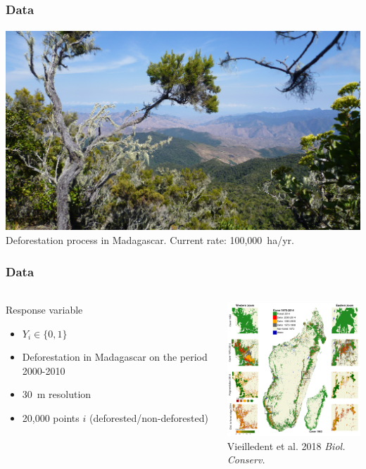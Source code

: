 \documentclass[slidetop,10pt,dvipsnames,leqno,fleqn]{beamer} %
\begin{document}
\begin{frame}
  \frametitle{Data}
  \framesubtitle{}
  \begin{center}
    \includegraphics[width=\textwidth]{./Figures/deforestation_sambirano.JPG}\\
    Deforestation process in Madagascar. Current rate: 100,000~ha/yr.
  \end{center}
\end{frame}

\begin{frame}
  \frametitle{Data}
  \framesubtitle{}
    \begin{columns}
    \begin{column}{0.45\textwidth}
      \begin{block}{Response variable}
        \begin{itemize}
        \item $Y_i \in \{0, 1\}$
        \item Deforestation in Madagascar on the period 2000-2010
        \item 30~m resolution
        \item 20,000 points $i$ (deforested/non-deforested)  
        \end{itemize}
      \end{block}
    \end{column}
    \begin{column}{0.55\textwidth}
      \centering \includegraphics[width=6cm]{./Figures/fig_fcc.png}\\
      {\small Vieilledent et al. 2018 \textit{Biol. Conserv.}} 
    \end{column}
  \end{columns}
\end{frame}
\end{document}
